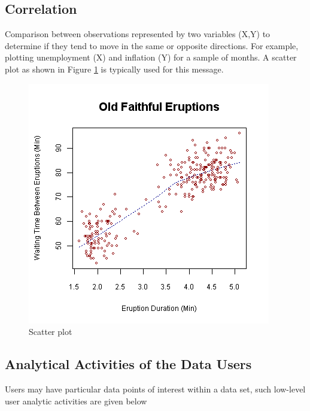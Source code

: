 \subsection{Correlation}
Comparison between observations represented by two variables (X,Y) to determine if they tend to move in the same or opposite directions. For example, plotting unemployment (X) and inflation (Y) for a sample of months. A scatter plot as shown in Figure \ref{fig:scatter} is typically used for this message.

\begin{figure}[h!]
	\centering
	\includegraphics[scale=0.4]{scatter}
	\caption{Scatter plot}
	\label{fig:scatter}
\end{figure}

\newpage
\subsection{Analytical Activities of the Data Users}
Users may have particular data points of interest within a data set, such low-level user analytic activities are given below

